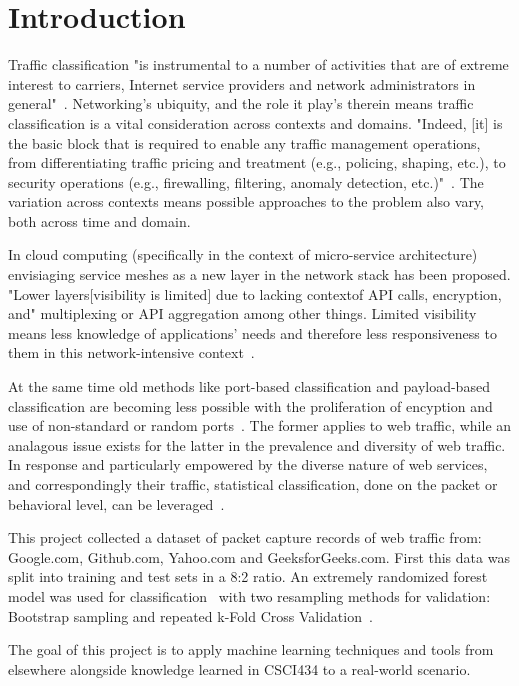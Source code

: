 \documentclass[10pt,sigconf,letterpaper,nonacm]{acmart}
\begin{document}
\section{Introduction}
Traffic classification "is instrumental to a number of activities that are of extreme
interest to carriers, Internet service providers and network administrators
in general"~\cite{Valenti2013}. Networking's ubiquity, and the role it play's therein
means traffic classification is a vital consideration across contexts and domains.
"Indeed, [it] is the basic block that is required to enable any traffic management
operations, from differentiating traffic pricing and treatment (e.g., policing, shaping,
etc.), to security operations (e.g., firewalling, filtering, anomaly detection,
etc.)"~\cite{Valenti2013}. The variation across contexts means possible approaches to the
problem also vary, both across time and domain.
\par In cloud computing (specifically in  the context of micro-service architecture)
envisiaging service meshes as a new layer in the network stack has been proposed. "Lower
layers[visibility is limited] due to lacking contextof API calls, encryption, and"
multiplexing or API aggregation among other things. Limited visibility means less knowledge
of applications' needs and therefore less responsiveness to them in this network-intensive
context~\cite{Ashok2021}.
\par At the same time old methods like port-based classification and payload-based
classification are becoming less
possible with the proliferation of encyption and use of non-standard or random
ports~\cite{Valenti2013}. The former applies to web traffic, while an analagous issue
exists for the latter in the prevalence and diversity of web traffic. In response and particularly
empowered by the diverse nature of
web services, and correspondingly their traffic, statistical classification, done on the packet or
behavioral level, can be leveraged~\cite{Valenti2013}.
\par This project collected a dataset of packet capture records of web traffic from:
Google.com, Github.com, Yahoo.com and GeeksforGeeks.com. First this data was split into
training and test sets in a 8:2 ratio. An extremely randomized forest
model was used for classification~\cite{Geurts2006} with two resampling methods for
validation: Bootstrap sampling and repeated k-Fold Cross Validation~\cite{Nakatsu2021}.
\par The goal of this project is to apply machine learning techniques and tools from
elsewhere alongside knowledge learned in CSCI434 to a real-world scenario.
\end{document}
